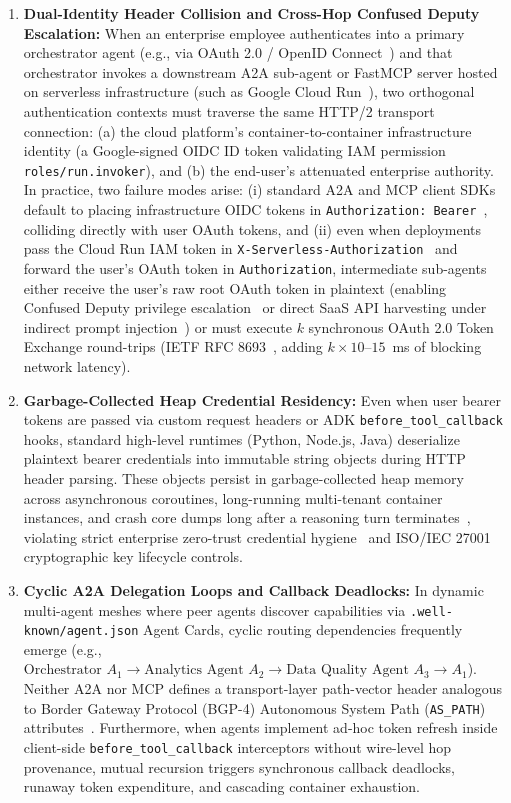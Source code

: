 \documentclass[conference,10pt]{IEEEtran}
\begin{document}
\begin{enumerate}
    \item \textbf{Dual-Identity Header Collision and Cross-Hop Confused Deputy Escalation:} When an enterprise employee authenticates into a primary orchestrator agent (e.g., via OAuth 2.0 / OpenID Connect~\cite{hardy1988confused, jones2015rfc7522}) and that orchestrator invokes a downstream A2A sub-agent or FastMCP server hosted on serverless infrastructure (such as Google Cloud Run~\cite{tsao2023cloudrun}), two orthogonal authentication contexts must traverse the same HTTP/2 transport connection: (a) the cloud platform's container-to-container infrastructure identity (a Google-signed OIDC ID token validating IAM permission \texttt{roles/run.invoker}), and (b) the end-user's attenuated enterprise authority. In practice, two failure modes arise: (i) standard A2A and MCP client SDKs default to placing infrastructure OIDC tokens in \texttt{Authorization: Bearer}~\cite{jones2012rfc6750}, colliding directly with user OAuth tokens, and (ii) even when deployments pass the Cloud Run IAM token in \texttt{X-Serverless-Authorization}~\cite{tsao2023cloudrun} and forward the user's OAuth token in \texttt{Authorization}, intermediate sub-agents either receive the user's raw root OAuth token in plaintext (enabling Confused Deputy privilege escalation~\cite{hardy1988confused} or direct SaaS API harvesting under indirect prompt injection~\cite{greshake2023promptinjection, zhan2024injecagent, debenedetti2024agentdojo}) or must execute $k$ synchronous OAuth 2.0 Token Exchange round-trips (IETF RFC 8693~\cite{jones2020rfc8693, raut2026transaction, prasad2026actor}, adding $k \times 10\text{--}15$~ms of blocking network latency).
    \item \textbf{Garbage-Collected Heap Credential Residency:} Even when user bearer tokens are passed via custom request headers or ADK \texttt{before\_tool\_callback} hooks, standard high-level runtimes (Python, Node.js, Java) deserialize plaintext bearer credentials into immutable string objects during HTTP header parsing. These objects persist in garbage-collected heap memory across asynchronous coroutines, long-running multi-tenant container instances, and crash core dumps long after a reasoning turn terminates~\cite{chow2005shredding, yang2017dse}, violating strict enterprise zero-trust credential hygiene~\cite{nist2020zerotrust} and ISO/IEC 27001 cryptographic key lifecycle controls.
    \item \textbf{Cyclic A2A Delegation Loops and Callback Deadlocks:} In dynamic multi-agent meshes where peer agents discover capabilities via \texttt{.well-known/agent.json} Agent Cards, cyclic routing dependencies frequently emerge (e.g., $\text{Orchestrator } A_1 \to \text{Analytics Agent } A_2 \to \text{Data Quality Agent } A_3 \to A_1$). Neither A2A nor MCP defines a transport-layer path-vector header analogous to Border Gateway Protocol (BGP-4) Autonomous System Path (\texttt{AS\_PATH}) attributes~\cite{rekhter2006bgp}. Furthermore, when agents implement ad-hoc token refresh inside client-side \texttt{before\_tool\_callback} interceptors without wire-level hop provenance, mutual recursion triggers synchronous callback deadlocks, runaway token expenditure, and cascading container exhaustion.

\end{enumerate}
\end{document}
